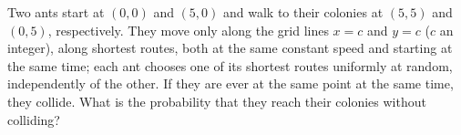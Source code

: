Two ants start at $(0,0)$ and $(5,0)$ and walk to their colonies at $(5,5)$ and $(0,5)$, respectively. They move only along the grid lines $x=c$ and $y=c$ ($c$ an integer), along shortest routes, both at the same constant speed and starting at the same time; each ant chooses one of its shortest routes uniformly at random, independently of the other. If they are ever at the same point at the same time, they collide. What is the probability that they reach their colonies without colliding?
